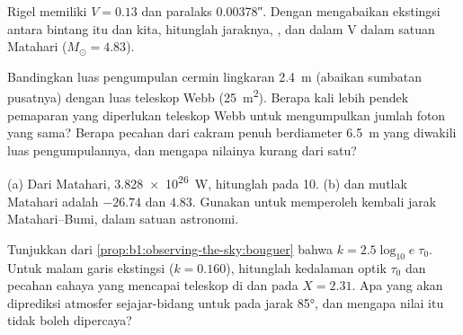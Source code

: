 \begin{exercise}[$\star\star$]\label{exo:b1:observing-the-sky:7}
Rigel memiliki $V = 0.13$ dan paralaks \ang{;;0.00378}. Dengan mengabaikan ekstingsi antara bintang itu dan kita, hitunglah jaraknya, , dan  dalam V dalam satuan Matahari ($M_\odot = 4.83$).
\end{exercise}

\begin{exercise}[$\star\star$]\label{exo:b1:observing-the-sky:8}
Bandingkan luas pengumpulan cermin lingkaran \qty{2.4}{m} (abaikan sumbatan pusatnya) dengan luas teleskop Webb (\qty{25}{m^2}). Berapa kali lebih pendek pemaparan yang diperlukan teleskop Webb untuk mengumpulkan jumlah foton yang sama? Berapa pecahan dari cakram penuh berdiameter \qty{6.5}{m} yang diwakili luas pengumpulannya, dan mengapa nilainya kurang dari satu?
\end{exercise}

\begin{exercise}[$\star\star$]\label{exo:b1:observing-the-sky:9}
(a) Dari  Matahari, \qty{3.828e26}{W}, hitunglah  pada \qty{10}{\parsec}. (b)  dan mutlak Matahari adalah $-26.74$ dan $4.83$. Gunakan  untuk memperoleh kembali jarak Matahari--Bumi, dalam satuan astronomi.
\end{exercise}

\begin{exercise}[$\star\star\star$]\label{exo:b1:observing-the-sky:10}
Tunjukkan dari \cref{prop:b1:observing-the-sky:bouguer} bahwa $k =
2.5\log_{10}e\;\tau_0$. Untuk malam garis ekstingsi ($k =
\num{0.160}$), hitunglah kedalaman optik  $\tau_0$ dan pecahan cahaya yang mencapai teleskop di  dan pada $X = 2.31$. Apa yang akan diprediksi atmosfer sejajar-bidang untuk  pada jarak  \ang{85}, dan mengapa nilai itu tidak boleh dipercaya?
\end{exercise}

